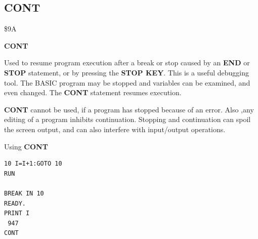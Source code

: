 \subsection{CONT}
\begin{description}[leftmargin=2cm,style=nextline]
\item [Token:] \$9A
\item [Format:] {\bf CONT}
\item [Usage:] Used to resume
               program execution after a break or stop caused by
               an {\bf END} or {\bf STOP} statement, or by pressing
               the {\bf STOP KEY}.
               This is a useful debugging tool. The BASIC program may be stopped
               and variables can be examined, and even changed.
               The {\bf CONT} statement resumes execution.
\item [Remarks:] {\bf CONT} cannot be used, if a program has stopped because
               of an error. Also ,any editing of a program
               inhibits continuation. Stopping and continuation
               can spoil the screen output, and can also interfere with
               input/output operations.
\item [Example:] Using {\bf CONT}
\begin{tcolorbox}[colback=black,coltext=white]
\verbatimfont{\codefont}
\begin{verbatim}
10 I=I+1:GOTO 10
RUN

BREAK IN 10
READY.
PRINT I
 947
CONT
\end{verbatim}
\end{tcolorbox}
\end{description}


\newpage
